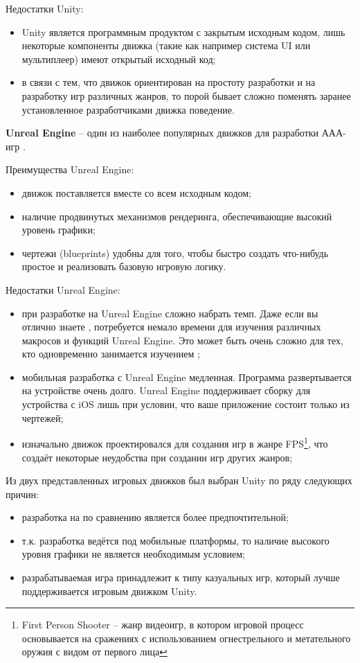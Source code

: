 Недостатки Unity:
\begin{itemize}
    \item Unity является программным продуктом с закрытым исходным кодом, лишь некоторые компоненты движка (такие как например система UI или мультиплеер) имеют открытый исходный код;
    \item в связи с тем, что движок ориентирован на простоту разработки и на разработку игр различных жанров, то порой бывает сложно поменять заранее установленное разработчиками движка поведение.
\end{itemize}

\textbf{Unreal Engine} -- один из наиболее популярных движков для разработки ААА-игр \cite{Unreal}.

Преимущества Unreal Engine:
\begin{itemize}
    \item движок поставляется вместе со всем исходным кодом;
    \item наличие продвинутых механизмов рендеринга, обеспечивающие высокий уровень графики;
    \item чертежи (blueprints) удобны для того, чтобы быстро создать что-нибудь простое и реализовать базовую игровую логику.
\end{itemize}

Недостатки Unreal Engine:
\begin{itemize}
    \item при разработке на Unreal Engine сложно набрать темп. Даже если вы отлично знаете \CPP, потребуется немало времени для изучения различных макросов и функций Unreal Engine. Это может быть очень сложно для тех, кто одновременно занимается изучением \CPP;
    \item мобильная разработка с Unreal Engine медленная. Программа развертывается на устройстве очень долго. Unreal Engine поддерживает сборку для устройства с iOS лишь при условии, что ваше приложение состоит только из чертежей;
    \item изначально движок проектировался для создания игр в жанре FPS\footnote{First Person Shooter -- жанр видеоигр, в котором игровой процесс основывается на сражениях с использованием огнестрельного и метательного оружия с видом от первого лица}, что создаёт некоторые неудобства при создании игр других жанров;
\end{itemize}

Из двух представленных игровых движков был выбран Unity по ряду следующих причин:
\begin{itemize}
    \item разработка на \CSharp по сравнению \CPP является более предпочтительной;
    \item т.к. разработка ведётся под мобильные платформы, то наличие высокого уровня графики не является необходимым условием;
    \item разрабатываемая игра принадлежит к типу казуальных игр, который лучше поддерживается игровым движком Unity.
\end{itemize}

